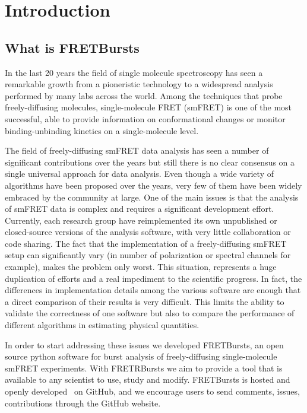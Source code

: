 \section{Introduction}

\subsection{What is FRETBursts}

In the last 20 years the field of single molecule spectroscopy has seen a remarkable
growth from a pioneristic technology to a widespread analysis performed by many labs
across the world. Among the techniques that probe freely-diffusing molecules,
single-molecule FRET (smFRET) is one of the most successful, able to provide
information on conformational changes or monitor binding-unbinding kinetics on
a single-molecule level.

The field of freely-diffusing smFRET data analysis has seen a number of significant 
contributions over the years but still there is no clear consensus on a single
universal approach for data analysis.
Even though a wide variety of algorithms have been proposed over the years, very few 
of them have been widely embraced by the community at large. One of the main issues 
is that the analysis of smFRET data is complex and requires a significant 
development effort. Currently,
each research group have reimplemented its own unpublished or closed-source versions
of the analysis software, with very little collaboration or code sharing. 
The fact that the implementation of a freely-diffusing smFRET setup can significantly 
vary (in number of polarization or spectral channels for example), 
makes the problem only worst.
This situation, represents a huge duplication of efforts and a real 
impediment to the scientific progress. 
In fact, the differences in implementation details among the various software
are enough that a direct comparison of their results is very difficult. 
This limits the ability to validate the correctness
of one software but also to compare the performance of different algorithms
in estimating physical quantities.

In order to start addressing these issues we developed FRETBursts, 
an open source python software for burst analysis of freely-diffusing
single-molecule smFRET experiments. 
With FRETRBursts we aim to provide a tool that is available to any scientist
to use, study and modify. 
FRETBursts is hosted and openly developed~\cite{Prli__2012} on GitHub, 
and we encourage users to send comments, issues, contributions through
the GitHub website.

